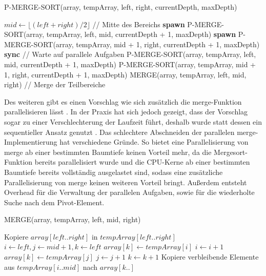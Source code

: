 \documentclass[fontsize=12pt,paper=a4,twoside=semi,parskip=half-,headsepline,headinclude]{scrreprt}
\begin{document}
\begin{algorithm}[H]
	\caption{P-MERGE-SORT(array, tempArray, left, right, currentDepth, maxDepth)}
	\begin{algorithmic}[1]
		\RETURN
		\ENDIF
		\STATE $mid \gets \lfloor (left + right) / 2 \rfloor$ \hfill // Mitte des Bereichs
		\STATE \textbf{spawn} P-MERGE-SORT(array, tempArray, left, mid, currentDepth + 1, maxDepth)
		\STATE \textbf{spawn} P-MERGE-SORT(array, tempArray, mid + 1, right, currentDepth + 1, maxDepth)
		\STATE \textbf{sync} \hfill // Warte auf parallele Aufgaben
		\ELSE
		\STATE P-MERGE-SORT(array, tempArray, left, mid, currentDepth + 1, maxDepth)
		\STATE P-MERGE-SORT(array, tempArray, mid + 1, right, currentDepth + 1, maxDepth)
		\ENDIF
		\STATE MERGE(array, tempArray, left, mid, right) \hfill // Merge der Teilbereiche
	\end{algorithmic}
\end{algorithm}

Des weiteren gibt  es einen Vorschlag wie sich zusätzlich die merge-Funktion parallelisieren lässt \cite[S. 776-782]{Cormen2022}. In der Praxis hat sich jedoch gezeigt, dass der Vorschlag sogar zu einer Verschlechterung der Laufzeit führt, deshalb wurde statt dessen ein sequentieller Ansatz genutzt \cite[S. 36]{Cormen2022}. Das schlechtere Abschneiden der parallelen merge-Implementierung hat verschiedene Gründe. So bietet eine Parallelisierung von merge ab einer bestimmten Baumtiefe keinen Vorteil mehr, da die Mergesort-Funktion bereits parallelisiert wurde und  die CPU-Kerne ab einer bestimmten Baumtiefe bereits vollständig ausgelastet sind, sodass eine zusätzliche Parallelisierung von merge keinen weiteren Vorteil bringt. Außerdem entsteht Overhead für die Verwaltung der parallelen Aufgaben, sowie für die wiederholte Suche nach dem Pivot-Element.

\begin{algorithm}[H]
	\caption{MERGE(array, tempArray, left, mid, right)}
	\begin{algorithmic}[1]
		\STATE Kopiere $array[left..right]$ in $tempArray[left..right]$
		\STATE $i \gets left, j \gets mid + 1, k \gets left$
		\STATE $array[k] \gets tempArray[i]$
		\STATE $i \gets i + 1$
		\ELSE
		\STATE $array[k] \gets tempArray[j]$
		\STATE $j \gets j + 1$
		\ENDIF
		\STATE $k \gets k + 1$
		\ENDWHILE
		\STATE Kopiere verbleibende Elemente aus $tempArray[i..mid]$ nach $array[k..]$
	\end{algorithmic}
\end{algorithm}
\end{document}
